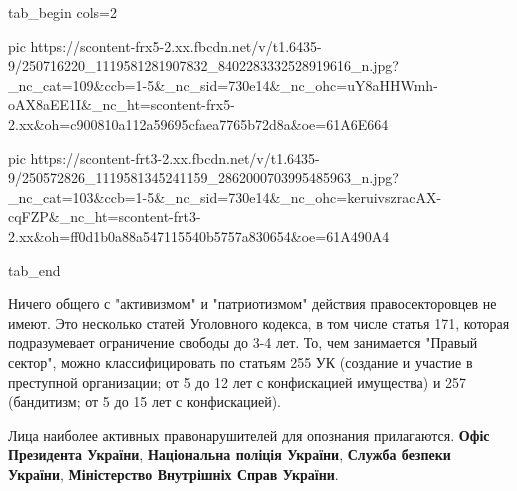 \ifcmt
  tab_begin cols=2

     pic https://scontent-frx5-2.xx.fbcdn.net/v/t1.6435-9/250716220_1119581281907832_8402283332528919616_n.jpg?_nc_cat=109&ccb=1-5&_nc_sid=730e14&_nc_ohc=uY8aHHWmh-oAX8aEE1I&_nc_ht=scontent-frx5-2.xx&oh=c900810a112a59695cfaea7765b72d8a&oe=61A6E664

     pic https://scontent-frt3-2.xx.fbcdn.net/v/t1.6435-9/250572826_1119581345241159_2862000703995485963_n.jpg?_nc_cat=103&ccb=1-5&_nc_sid=730e14&_nc_ohc=keruivszracAX-cqFZP&_nc_ht=scontent-frt3-2.xx&oh=ff0d1b0a88a547115540b5757a830654&oe=61A490A4

  tab_end
\fi

Ничего общего с "активизмом" и "патриотизмом" действия правосекторовцев не
имеют. Это несколько статей Уголовного кодекса, в том числе статья 171, которая
подразумевает ограничение свободы до 3-4 лет. То, чем занимается "Правый
сектор", можно классифицировать по статьям 255 УК (создание и участие в
преступной организации; от 5 до 12 лет с конфискацией имущества) и 257
(бандитизм; от 5 до 15 лет с конфискацией). 

Лица наиболее активных правонарушителей для опознания прилагаются. \textbf{Офіс
Президента України}, \textbf{Національна поліція України}, \textbf{Служба безпеки України},
\textbf{Міністерство Внутрішніх Справ України}.

